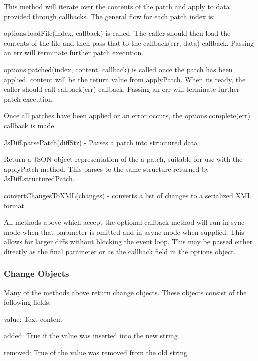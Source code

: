 \begin{DoxyItemize}
This method will iterate over the contents of the patch and apply to data provided through callbacks. The general flow for each patch index is\+:
\begin{DoxyItemize}
\item {\ttfamily options.\+load\+File(index, callback)} is called. The caller should then load the contents of the file and then pass that to the {\ttfamily callback(err, data)} callback. Passing an {\ttfamily err} will terminate further patch execution.
\item {\ttfamily options.\+patched(index, content, callback)} is called once the patch has been applied. {\ttfamily content} will be the return value from {\ttfamily apply\+Patch}. When it\textquotesingle{}s ready, the caller should call {\ttfamily callback(err)} callback. Passing an {\ttfamily err} will terminate further patch execution.
\end{DoxyItemize}

Once all patches have been applied or an error occurs, the {\ttfamily options.\+complete(err)} callback is made.
\item {\ttfamily Js\+Diff.\+parse\+Patch(diff\+Str)} -\/ Parses a patch into structured data

Return a J\+S\+ON object representation of the a patch, suitable for use with the {\ttfamily apply\+Patch} method. This parses to the same structure returned by {\ttfamily Js\+Diff.\+structured\+Patch}.
\item {\ttfamily convert\+Changes\+To\+X\+M\+L(changes)} -\/ converts a list of changes to a serialized X\+ML format
\end{DoxyItemize}

All methods above which accept the optional {\ttfamily callback} method will run in sync mode when that parameter is omitted and in async mode when supplied. This allows for larger diffs without blocking the event loop. This may be passed either directly as the final parameter or as the {\ttfamily callback} field in the {\ttfamily options} object.

\subsubsection*{Change Objects}

Many of the methods above return change objects. These objects consist of the following fields\+:


\begin{DoxyItemize}
\item {\ttfamily value}\+: Text content
\item {\ttfamily added}\+: True if the value was inserted into the new string
\item {\ttfamily removed}\+: True of the value was removed from the old string
\end{DoxyItemize}

